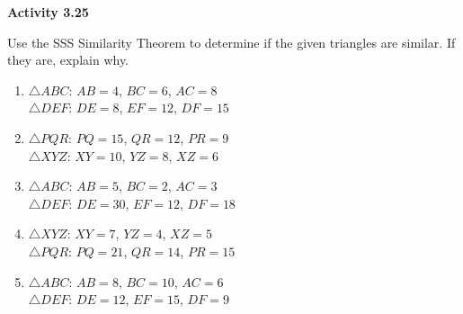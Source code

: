 \vspace{0.3ex}
\noindent\textbf{Activity 3.25}

\vspace{0.2ex}

Use the SSS Similarity Theorem to determine if the given triangles are similar. If they are, explain why.

\begin{enumerate}[label=\color{blue}\arabic*.]
    \item \(\triangle ABC\): \(AB = 4\), \(BC = 6\), \(AC = 8\) \\
          \(\triangle DEF\): \(DE = 8\), \(EF = 12\), \(DF = 15\)
    \item \(\triangle PQR\): \(PQ = 15\), \(QR = 12\), \(PR = 9\) \\
          \(\triangle XYZ\): \(XY = 10\), \(YZ = 8\), \(XZ = 6\)
    \item \(\triangle ABC\): \(AB = 5\), \(BC = 2\), \(AC = 3\) \\
          \(\triangle DEF\): \(DE = 30\), \(EF = 12\), \(DF = 18\)
    \item \(\triangle XYZ\): \(XY = 7\), \(YZ = 4\), \(XZ = 5\) \\
          \(\triangle PQR\): \(PQ = 21\), \(QR = 14\), \(PR = 15\)
    \item \(\triangle ABC\): \(AB = 8\), \(BC = 10\), \(AC = 6\) \\
          \(\triangle DEF\): \(DE = 12\), \(EF = 15\), \(DF = 9\)
\end{enumerate}
